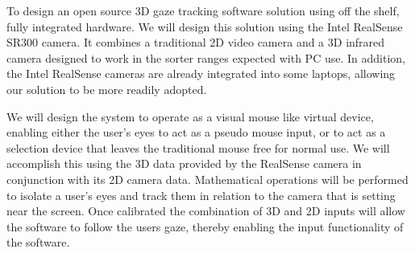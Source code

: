 
To design an open source 3D gaze tracking software solution using off the shelf, fully integrated hardware. We will design this solution using the Intel RealSense SR300 camera. It combines a traditional 2D video camera and a 3D infrared camera designed to work in the sorter ranges expected with PC use. In addition, the Intel RealSense cameras are already integrated into some laptops, allowing our solution to be more readily adopted. 

We will design the system to operate as a visual mouse like virtual device, enabling either the user's eyes to act as a pseudo mouse input, or to act as a selection device that leaves the traditional mouse free for normal use. We will accomplish this using the 3D data provided by the RealSense camera in conjunction with its 2D camera data. Mathematical operations will be performed to isolate a user's eyes and track them in relation to the camera that is setting near the screen. Once calibrated the combination of 3D and 2D inputs will allow the software to follow the users gaze, thereby enabling the input functionality of the software.
